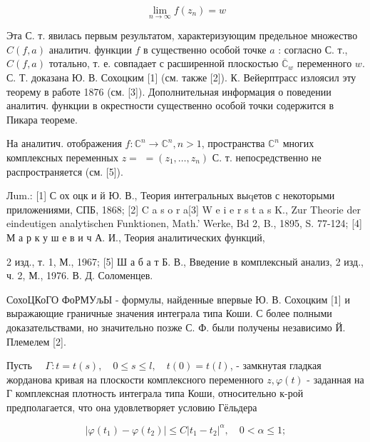 \documentclass[10pt]{article}
\begin{document}
\[

\lim _{n \rightarrow \infty} f\left(z_{n}\right)=w

\]



Эта С. т. явилась первым результатом, характеризующим предельное множество $C(f, a)$ аналитич. функции $f$ в существенно особой точке $a$ : согласно С. т., $C(f, a)$ тотально, т. е. совпадает с расширенной плоскостью $\overline{\mathbb{C}}_{w}$ переменного $w$. С. Т. доказана Ю. В. Сохоцким [1] (см. также [2]). К. Вейерптрасс излоясил эту теорему в работе 1876 (см. [3]). Дополнительная информация о поведении аналитич. функции в окрестности существенно особой точки содержится в Пикара теореме.



На аналитич. отображения $f: \mathbb{C}^{n} \rightarrow \mathbb{C}^{n}, n>1$, пространства $\mathbb{C}^{n}$ многих комплексных переменных $z=$ $=\left(z_{1}, \ldots, z_{n}\right)$ С. т. непосредственно не распространяется (см. [5]).



Лum.: [1] С ох оцк и й Ю. В., Теория интегральных выqетов с некоторыми приложениями, СПБ, 1868; [2] C a s o r a[3] W e i e r s t a s $\mathrm{K}$., Zur Theorie der eindeutigen analytischen Funktionen, Math.' Werke, Bd 2, B., 1895, S. 77-124; [4] М а р к у ш е в и ч А. И., Теория аналитических функций,

2 изд., т. 1, М., 1967; [5] Ш а б а т Б. В., Введение в комплексный анализ, 2 изд., ч. 2, М., 1976. В. Д. Соломенцев.



СохоЦКоГО ФоРМУљЫ - формулы, найденные впервые Ю. В. Сохоцким [1] и выражающие граничные значения интеграла типа Коши. С более полными доказательствами, но значительно позже С. Ф. были получены независимо Й. Племелем [2].



Пусть $\quad \Gamma: t=t(s), \quad 0 \leqslant s \leqslant l, \quad t(0)=t(l)$, - замкнутая гладкая жорданова кривая на плоскости комплексного переменного $z, \varphi(t)$ - заданная на Г комплексная плотность интеграла типа Коши, относительно к-рой предполагается, что она удовлетворяет условию Гёльдера



\[

\left|\varphi\left(t_{1}\right)-\varphi\left(t_{2}\right)\right| \leqslant C\left|t_{1}-t_{2}\right|^{\alpha}, \quad 0<\alpha \leqslant 1 ;

\]
\end{document}
